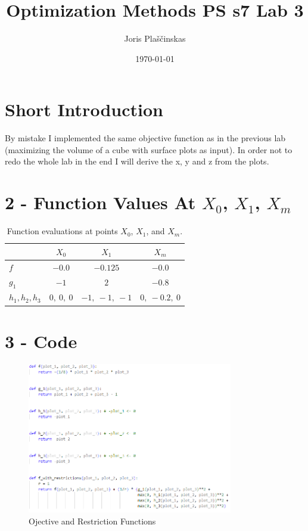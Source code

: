 \documentclass{article}
\title{Optimization Methods PS s7 Lab 3}
\author{Joris Plaščinskas}
\date{\today}
\begin{document}
\maketitle
\section*{Short Introduction}
By mistake I implemented the same objective function as in the previous lab (maximizing the volume of a cube with surface plots as input). In order not to redo the whole lab in the end I will derive the x, y and z from the plots.

\section*{2 - Function Values At $X_0$, $X_1$, $X_m$}
\begin{table}[h]
    \centering
    \begin{tabular}{|l|c|c|c|}
        \hline
         & $X_0$ & $X_1$ & $X_m$ \\
        \hline
        $f$ & $-0.0$ & $-0.125$ & $-0.0$ \\
        \hline
        $g_1$ & $-1$ & $2$ & $-0.8$ \\
        \hline
        $h_1, h_2, h_3$ & $0,\ 0,\ 0$ & $-1,\ -1,\ -1$ & $0,\ -0.2,\ 0$ \\
        \hline
    \end{tabular}
    \caption{Function evaluations at points $X_0$, $X_1$, and $X_m$.}
\end{table}


\section*{3 - Code}
\begin{figure}[H]
    \centering
    \includegraphics[width=0.8\textwidth]{functions.png}
    \caption{Ojective and Restriction Functions}
    \label{fig:example}
\end{figure}
\end{document}
